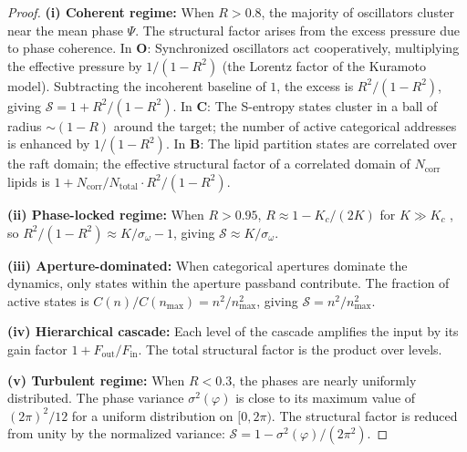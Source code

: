 \documentclass[twocolumn,10pt]{article}
\theoremstyle{remark}
\newcommand{\CatO}{\mathbf{O}}
\newcommand{\CatC}{\mathbf{C}}
\newcommand{\CatB}{\mathbf{B}}
\begin{document}
\begin{proof}
\textbf{(i) Coherent regime:}
When $R > 0.8$, the majority of oscillators cluster near the mean phase $\Psi$.
The structural factor arises from the excess pressure due to phase coherence.
In $\CatO$: Synchronized oscillators act cooperatively, multiplying the effective pressure by $1/(1-R^2)$ (the Lorentz factor of the Kuramoto model).
Subtracting the incoherent baseline of $1$, the excess is $R^2/(1-R^2)$, giving $\mathcal{S} = 1 + R^2/(1-R^2)$.
In $\CatC$: The S-entropy states cluster in a ball of radius $\sim(1-R)$ around the target; the number of active categorical addresses is enhanced by $1/(1-R^2)$.
In $\CatB$: The lipid partition states are correlated over the raft domain; the effective structural factor of a correlated domain of $N_{\mathrm{corr}}$ lipids is $1 + N_{\mathrm{corr}}/N_{\mathrm{total}} \cdot R^2/(1-R^2)$.

\textbf{(ii) Phase-locked regime:}
When $R > 0.95$, $R \approx 1 - K_c/(2K)$ for $K \gg K_c$ \cite{strogatz2000}, so $R^2/(1-R^2) \approx K/\sigma_\omega - 1$, giving $\mathcal{S} \approx K/\sigma_\omega$.

\textbf{(iii) Aperture-dominated:}
When categorical apertures dominate the dynamics, only states within the aperture passband contribute.
The fraction of active states is $C(n)/C(n_{\max}) = n^2/n_{\max}^2$, giving $\mathcal{S} = n^2/n_{\max}^2$.

\textbf{(iv) Hierarchical cascade:}
Each level of the cascade amplifies the input by its gain factor $1 + F_{\mathrm{out}}/F_{\mathrm{in}}$.
The total structural factor is the product over levels.

\textbf{(v) Turbulent regime:}
When $R < 0.3$, the phases are nearly uniformly distributed.
The phase variance $\sigma^2(\varphi)$ is close to its maximum value of $(2\pi)^2/12$ for a uniform distribution on $[0,2\pi)$.
The structural factor is reduced from unity by the normalized variance: $\mathcal{S} = 1 - \sigma^2(\varphi)/(2\pi^2)$.
\end{proof}
\end{document}
